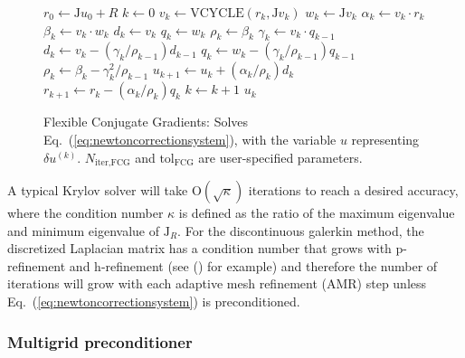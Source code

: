 \begin{figure}
  \begin{algorithm}[H]
    \caption{\label{alg:FCG}
    Flexible Conjugate Gradients: Solves Eq.~(\ref{eq:newtoncorrectionsystem}), with the variable $u$ representing $\delta u^{(k)}$. $N_{\text{iter,FCG}}$ and $\text{tol}_{\text{FCG}}$ are user-specified parameters.}%
    \begin{algorithmic}[1]
      \State $r_0 \leftarrow \mathrm{J}u_0 + R$
      \State $k \leftarrow 0$
      \State $v_k \leftarrow \text{VCYCLE}(r_k,\mathrm{J}v_k)$
      \State $w_k \leftarrow \mathrm{J}v_k$
      \State $\alpha_k \leftarrow v_k \cdot r_k$ 
      \State $\beta_k \leftarrow v_k \cdot w_k$
      \State $d_k \leftarrow v_k$
      \State $q_k \leftarrow w_k$
      \State $\rho_k \leftarrow \beta_k$
      \Else
      \State $\gamma_k \leftarrow v_k \cdot q_{k-1}$
      \State $d_k \leftarrow v_k - (\gamma_k/\rho_{k-1})d_{k-1}$
      \State $q_k \leftarrow w_k - (\gamma_k/\rho_{k-1})q_{k-1}$
      \State $\rho_k \leftarrow \beta_k - \gamma^2_k/\rho_{k-1}$
      \EndIf
      \State $u_{k+1} \leftarrow u_k + (\alpha_k/\rho_k)d_k$
      \State $r_{k+1} \leftarrow r_k - (\alpha_k/\rho_k)q_k$
      \State $k \leftarrow k+1$
      \EndWhile
      \State \Return $u_k$
      \EndFunction
    \end{algorithmic}
  \end{algorithm}
\end{figure}

A typical Krylov solver will take $\mathrm{O}(\sqrt{\kappa})$
iterations to reach a desired accuracy, where the condition number
$\kappa$ is defined as the ratio of the maximum eigenvalue and minimum
eigenvalue of $\mathrm{J}_R$. For the  discontinuous
galerkin method, the discretized Laplacian matrix has a condition
number that grows with p-refinement and h-refinement (see (\citet*{antonietti2011class,hesthaven2008nodal}) for example) and therefore the number of iterations will grow with each adaptive mesh refinement (AMR) step unless Eq.~(\ref{eq:newtoncorrectionsystem}) is preconditioned.

\subsubsection{Multigrid preconditioner}

